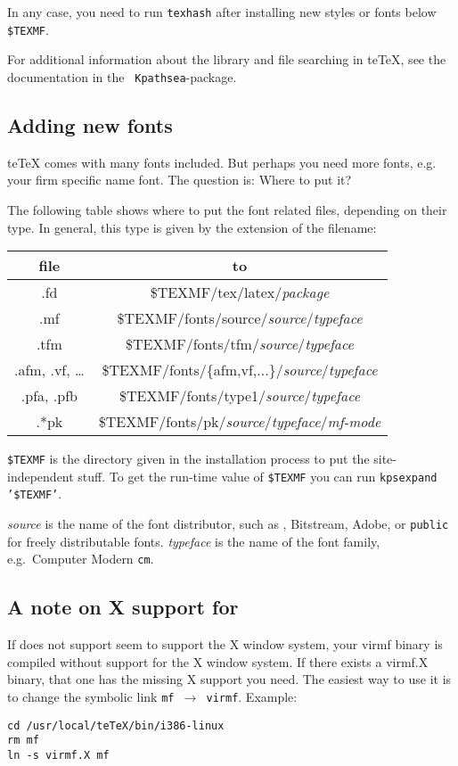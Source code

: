 \documentclass[12pt,a4paper]{article}
\newcommand{\teTeX}{\textrm{te}\TeX\xspace}
\begin{document}
In any case, you need to run {\tt texhash} after installing
new styles or fonts below \verb|$TEXMF|. %

For additional information about the library and file
searching in \teTeX{}, see the documentation in the {\tt
  Kpathsea}-package.

\subsection{Adding new fonts}
\label{ssec:adf}

\teTeX comes with many fonts included. But perhaps you need
more fonts, e.g. your firm specific name font. The question
is: Where to put it?

The following table shows where to put the font related
files, depending on their type. In general, this type is
given by the extension of the filename:\medskip

\begin{tabular}{|c|c|}
\hline
{\rmfamily file} & to \\ \hline
.fd & \$TEXMF/tex/latex/{\it package}\\
.mf & \$TEXMF/fonts/source/{\it source}/{\it typeface} \\
.tfm & \$TEXMF/fonts/tfm/{\it source}/{\it typeface} \\
.afm, .vf, \dots & \$TEXMF/fonts/\{afm,vf,...\}/{\it source}/{\it typeface}\\
.pfa, .pfb & \$TEXMF/fonts/type1/{\it source}/{\it typeface} \\
.*pk & \$TEXMF/fonts/pk/{\it source}/{\it typeface}/{\it mf-mode} \\
\hline
\end{tabular}\medskip

{\tt \$TEXMF} is the directory given in the installation
process to put the site-independent stuff. To get the
run-time value of {\tt \$TEXMF} you can run {\tt kpsexpand
  '\$TEXMF'}.

{\it source} is the name of the font distributor, such as
\AmS, Bitstream, Adobe, or {\tt public} for freely
distributable fonts.  {\it typeface} is the name of the font
family, e.g.\ Computer Modern {\tt cm}.

\subsection{A note on X support for \MF}

If \MF{} does not support seem to support the X window
system, your virmf binary is compiled without support for
the X window system. If there exists a virmf.X binary, that
one has the missing X support you need. The easiest way to
use it is to change the symbolic link \texttt{mf $\to$
  virmf}. Example:
\begin{verbatim}
cd /usr/local/teTeX/bin/i386-linux
rm mf
ln -s virmf.X mf
\end{verbatim}
\end{document}
